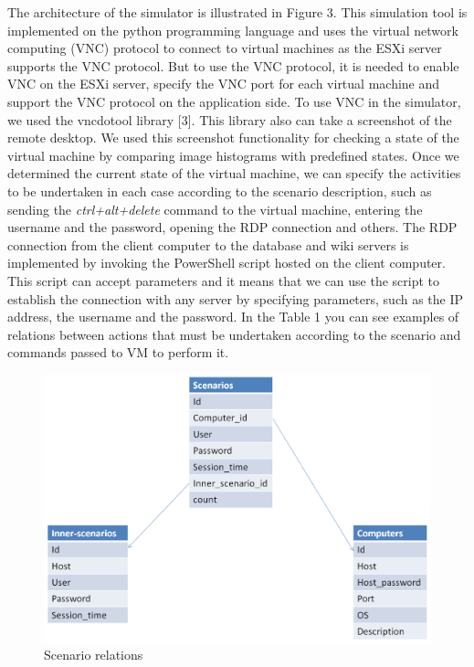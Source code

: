 The architecture of the simulator is illustrated in Figure 3. This simulation tool is implemented on the python programming language and uses the virtual network computing (VNC) protocol to connect to virtual machines as the ESXi server supports the VNC protocol. But to use the VNC protocol, it is needed to enable VNC on the ESXi server, specify the VNC port for each virtual machine and support the VNC protocol on the application side. To use VNC in the simulator, we used the vncdotool library [3]. This library also can take a screenshot of the remote desktop. We used this screenshot functionality for checking a state of the virtual machine by comparing image histograms with predefined states. Once we determined the current state of the virtual machine, we can specify the activities to be undertaken in each case according to the scenario description, such as sending the \textit{ctrl+alt+delete} command to the virtual machine, entering the username and the password, opening the RDP connection and others. The RDP connection from the client computer to the database and wiki servers is implemented by invoking the PowerShell script hosted on the client computer. This script can accept parameters and it means that we can use the script to establish the connection with any server by specifying parameters, such as the IP address, the username and the password. In the Table 1 you can see examples of relations between actions that must be undertaken according to the scenario and commands passed to VM to perform it.



\begin{figure}[ht!]
\centering
\includegraphics[width=\columnwidth]{figures/scenario_relations.png}
\caption{Scenario relations}
\label{overflow}
\end{figure}


